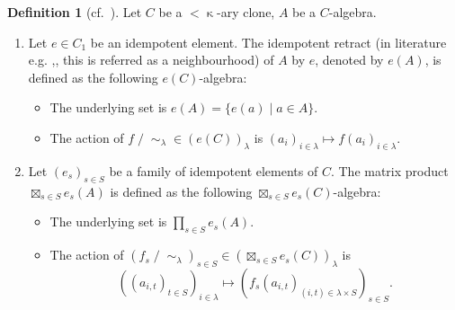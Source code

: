 \documentclass[a4paper,10pt]{article}
\theoremstyle{definition}
\newtheorem{df}{Definition}[section]
\newtheorem{rem}[df]{Remark}
\newcommand\sm{\setminus}
\newcommand\mc{\mathclose}
\begin{document}
\begin{df}[cf.\ {\cite[Definition 2.4, Lemma 3.5]{Kea}}]
Let $C$ be a $<\mc\kappa$-ary clone, $A$ be a $C$-algebra.
\begin{enumerate}
\item
Let $e\in C_1$ be an idempotent element.
The idempotent retract (in literature e.g. \cite{Iza},\cite{Kea},
this is referred as a neighbourhood) of 
$A$ by $e$, denoted by $e(A)$, is defined as the following $e(C)$-algebra:
\begin{itemize}
\item
The underlying set is $e(A)=\{e(a)\mid a\in A\}$.
\item
The action of $f\mc/\mc\sim_\lambda\in (e(C))_{\lambda}$ is
$(a_i)_{i\in\lambda}\mapsto f(a_i)_{i\in\lambda}$.
\end{itemize}
\item
Let $(e_s)_{s\in S}$ be a family of idempotent elements of $C$.
The matrix product $\boxtimes_{s\in S}e_s(A)$ is defined as
the following $\boxtimes_{s\in S}e_s(C)$-algebra:
\begin{itemize}
\item
The underlying set is $\prod_{s\in S}e_s(A)$.
\item
The action of
$(f_s\mc/\mc\sim_\lambda)_{s\in S}\in (\boxtimes_{s\in S}e_s(C))_\lambda$ is
\[
((a_{i,t})_{t\in S})_{i\in\lambda}\mapsto 
(f_s(a_{i,t})_{(i,t)\in\lambda\times S})_{s\in S}.
\]
\end{itemize}
\end{enumerate}
\end{df}

\end{document}
